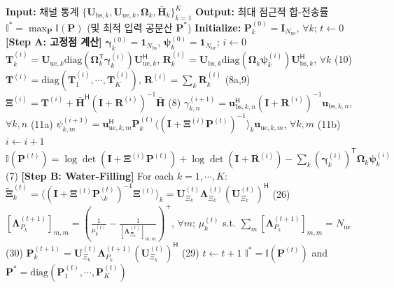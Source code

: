 \documentclass[10pt]{article}
\begin{document}
\begin{algorithm}[t]
\caption{점근적 합-전송률 최대화 (Asymptotic Programming)}
\small
\begin{algorithmic}[1]
\STATE \textbf{Input:} 채널 통계 $\{\mathbf{U}_{\text{bs},k}, \mathbf{U}_{\text{ue},k}, \boldsymbol{\Omega}_k, \bar{\mathbf{H}}_k\}_{k=1}^K$
\STATE \textbf{Output:} 최대 점근적 합-전송률 $\mathbb{I}^* = \max_{\mathbf{P}} \mathbb{I}(\mathbf{P})$ (및 최적 입력 공분산 $\mathbf{P}^*$)
\STATE \textbf{Initialize:} $\mathbf{P}_k^{(0)} = \mathbf{I}_{N_{\text{ue}}}$, $\forall k$; $t \gets 0$
\REPEAT
\STATE \textbf{[Step A: 고정점 계산]} $\boldsymbol{\gamma}_k^{(0)} = \mathbf{1}_{N_{\text{bs}}}$, $\boldsymbol{\psi}_k^{(0)} = \mathbf{1}_{N_{\text{ue}}}$; $i \gets 0$
\REPEAT
\STATE $\mathbf{T}_k^{(i)} = \mathbf{U}_{\text{ue},k} \mathrm{diag}(\boldsymbol{\Omega}_k^{\mathsf{T}} \boldsymbol{\gamma}_k^{(i)}) \mathbf{U}_{\text{ue},k}^{\mathsf{H}}$, $\mathbf{R}_k^{(i)} = \mathbf{U}_{\text{bs},k} \mathrm{diag}(\boldsymbol{\Omega}_k \boldsymbol{\psi}_k^{(i)}) \mathbf{U}_{\text{bs},k}^{\mathsf{H}}$, $\forall k$ \hfill (10)
\STATE $\mathbf{T}^{(i)} = \mathrm{diag}(\mathbf{T}_1^{(i)}, \cdots, \mathbf{T}_K^{(i)})$, $\mathbf{R}^{(i)} = \sum_{k} \mathbf{R}_k^{(i)}$ \hfill (8a,9)
\STATE $\boldsymbol{\Xi}^{(i)} = \mathbf{T}^{(i)} + \bar{\mathbf{H}}^{\mathsf{H}} (\mathbf{I} + \mathbf{R}^{(i)})^{-1} \bar{\mathbf{H}}$ \hfill (8)
\STATE $\gamma_{k,n}^{(i+1)} = \mathbf{u}_{\text{bs},k,n}^{\mathsf{H}} (\mathbf{I} + \mathbf{R}^{(i)})^{-1} \mathbf{u}_{\text{bs},k,n}$, $\forall k,n$ \hfill (11a)
\STATE $\psi_{k,m}^{(i+1)} = \mathbf{u}_{\text{ue},k,m}^{\mathsf{H}} \mathbf{P}_k^{(t)} \langle (\mathbf{I} + \boldsymbol{\Xi}^{(i)} \mathbf{P}^{(t)})^{-1} \rangle_k \mathbf{u}_{\text{ue},k,m}$, $\forall k,m$ \hfill (11b)
\STATE $i \gets i + 1$
\STATE $\mathbb{I}(\mathbf{P}^{(t)}) = \log \det(\mathbf{I} + \boldsymbol{\Xi}^{(i)} \mathbf{P}^{(t)}) + \log \det(\mathbf{I} + \mathbf{R}^{(i)}) - \sum_{k} (\boldsymbol{\gamma}_k^{(i)})^{\mathsf{T}} \boldsymbol{\Omega}_k \boldsymbol{\psi}_k^{(i)}$ \hfill (7)
\STATE
\STATE \textbf{[Step B: Water-Filling]} For each $k=1,\cdots,K$:
\STATE \quad $\widetilde{\boldsymbol{\Xi}}_k^{(t)} = \langle (\mathbf{I} + \boldsymbol{\Xi}^{(t)} \mathbf{P}_{\backslash k}^{(t)})^{-1} \boldsymbol{\Xi}^{(t)} \rangle_k = \mathbf{U}_{\Xi_k}^{(t)} \boldsymbol{\Lambda}_{\Xi_k}^{(t)} (\mathbf{U}_{\Xi_k}^{(t)})^{\mathsf{H}}$ \hfill (26)
\STATE \quad $[\boldsymbol{\Lambda}_{P_k}^{(t+1)}]_{m,m} = \left( \frac{1}{\mu_k^{(t)}} - \frac{1}{[\boldsymbol{\Lambda}_{\Xi_k}^{(t)}]_{m,m}} \right)^+$, $\forall m$; $\mu_k^{(t)}$ s.t. $\sum_m [\boldsymbol{\Lambda}_{P_k}^{(t+1)}]_{m,m} = N_{\text{ue}}$ \hfill (30)
\STATE \quad $\mathbf{P}_k^{(t+1)} = \mathbf{U}_{\Xi_k}^{(t)} \boldsymbol{\Lambda}_{P_k}^{(t+1)} (\mathbf{U}_{\Xi_k}^{(t)})^{\mathsf{H}}$ \hfill (29)
\STATE $t \gets t + 1$
\RETURN $\mathbb{I}^* = \mathbb{I}(\mathbf{P}^{(t)})$ and $\mathbf{P}^* = \mathrm{diag}(\mathbf{P}_1^{(t)}, \cdots, \mathbf{P}_K^{(t)})$
\end{algorithmic}
\end{algorithm}
\end{document}
